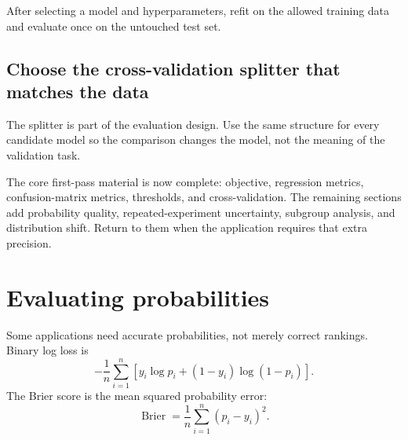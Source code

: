 After selecting a model and hyperparameters, refit on the allowed training data and evaluate once on the untouched test set.

\subsection{Choose the cross-validation splitter that matches the data}

\begin{keyidea}
The splitter is part of the evaluation design. Use the same structure for every candidate model so the comparison changes the model, not the meaning of the validation task.
\end{keyidea}

\begin{secondpass}
The core first-pass material is now complete: objective, regression metrics, confusion-matrix metrics, thresholds, and cross-validation. The remaining sections add probability quality, repeated-experiment uncertainty, subgroup analysis, and distribution shift. Return to them when the application requires that extra precision.
\end{secondpass}

\section{Evaluating probabilities}

Some applications need accurate probabilities, not merely correct rankings. Binary log loss is
\[
  -\frac{1}{n}\sum_{i=1}^{n}
  [y_i\log p_i+(1-y_i)\log(1-p_i)].
\]
The Brier score is the mean squared probability error:
\[
  \operatorname{Brier}
  =\frac{1}{n}\sum_{i=1}^{n}{(p_i-y_i)}^2.
\]

